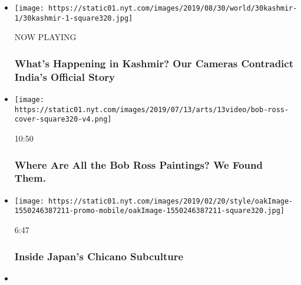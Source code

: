 \begin{itemize}
\item
  \texttt{[image: https://static01.nyt.com/images/2019/08/30/world/30kashmir-1/30kashmir-1-square320.jpg]}

  NOW PLAYING

  \hypertarget{whats-happening-in-kashmir-our-cameras-contradict-indias-official-story-2}{%
  \subsubsection{What's Happening in Kashmir? Our Cameras Contradict
  India's Official
  Story}\label{whats-happening-in-kashmir-our-cameras-contradict-indias-official-story-2}}
\item
  \href{https://www.nytimes.com/video/arts/100000005865824/bob-ross-paintings-mystery.html?action=click\&module=video-series-bar\&region=header\&pgtype=Article\&playlistId=video/Most-Viewed}{}

  \texttt{[image: https://static01.nyt.com/images/2019/07/13/arts/13video/bob-ross-cover-square320-v4.png]}

  10:50

  \hypertarget{where-are-all-the-bob-ross-paintings-we-found-them}{%
  \subsubsection{Where Are All the Bob Ross Paintings? We Found
  Them.}\label{where-are-all-the-bob-ross-paintings-we-found-them}}
\item
  \href{https://www.nytimes.com/video/style/100000005806771/japan-chicano-culture.html?action=click\&module=video-series-bar\&region=header\&pgtype=Article\&playlistId=video/Most-Viewed}{}

  \texttt{[image: https://static01.nyt.com/images/2019/02/20/style/oakImage-1550246387211-promo-mobile/oakImage-1550246387211-square320.jpg]}

  6:47

  \hypertarget{inside-japans-chicano-subculture}{%
  \subsubsection{Inside Japan's Chicano
  Subculture}\label{inside-japans-chicano-subculture}}
\item
  \href{https://www.nytimes.com/video/us/100000006207277/louisiana-school-viral-video-landry.html?action=click\&module=video-series-bar\&region=header\&pgtype=Article\&playlistId=video/Most-Viewed}{}


\end{itemize}
